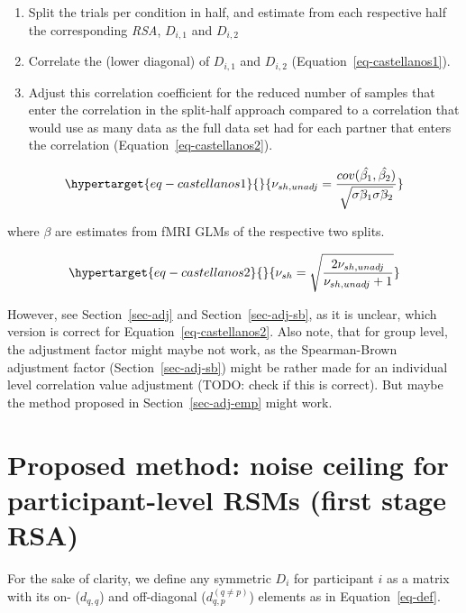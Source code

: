 \documentclass[
  letterpaper,
  DIV=11,
  numbers=noendperiod]{scrartcl}
\providecommand{\tightlist}{%
  \setlength{\itemsep}{0pt}\setlength{\parskip}{0pt}}\usepackage{longtable,booktabs,array}
\begin{document}
\begin{enumerate}
\def\labelenumi{\arabic{enumi}.}
\tightlist
\item
  Split the trials per condition in half, and estimate from each
  respective half the corresponding \emph{RSA}, \(D_{i,1}\) and
  \(D_{i,2}\)
\item
  Correlate the (lower diagonal) of \(D_{i,1}\) and \(D_{i,2}\)
  (Equation~\ref{eq-castellanos1}).
\item
  Adjust this correlation coefficient for the reduced number of samples
  that enter the correlation in the split-half approach compared to a
  correlation that would use as many data as the full data set had for
  each partner that enters the correlation
  (Equation~\ref{eq-castellanos2}).
\end{enumerate}

\begin{equation}\protect\hypertarget{eq-castellanos1}{}{
\nu_{sh,unadj} = \dfrac{cov(\hat{\beta_1},\hat{\beta_2})}{\sqrt{\hat{\sigma_{\hat{\beta_1}}} \hat{\sigma_{\hat{\beta_2}}}}}
}\label{eq-castellanos1}\end{equation}

where \(\beta\) are estimates from fMRI GLMs of the respective two
splits.

\begin{equation}\protect\hypertarget{eq-castellanos2}{}{
\nu_{sh} = \sqrt{\dfrac{2\nu_{sh,unadj}}{\nu_{sh,unadj}+1}}
}\label{eq-castellanos2}\end{equation}

However, see Section~\ref{sec-adj} and Section~\ref{sec-adj-sb}, as it
is unclear, which version is correct for Equation~\ref{eq-castellanos2}.
Also note, that for group level, the adjustment factor might maybe not
work, as the Spearman-Brown adjustment factor (Section~\ref{sec-adj-sb})
might be rather made for an individual level correlation value
adjustment (TODO: check if this is correct). But maybe the method
proposed in Section~\ref{sec-adj-emp} might work.

\hypertarget{sec-NC-PSM}{%
\section{Proposed method: noise ceiling for participant-level RSMs
(first stage RSA)}\label{sec-NC-PSM}}

For the sake of clarity, we define any symmetric \(D_i\) for participant
\(i\) as a matrix with its on- (\(d_{q,q}\)) and off-diagonal
(\(d_{q,p}^{(q \ne p)}\)) elements as in Equation~\ref{eq-def}.
\end{document}
